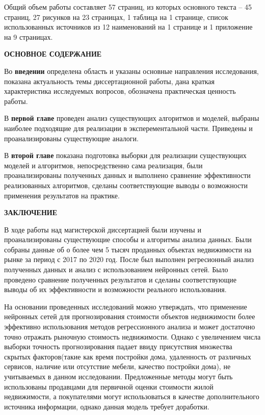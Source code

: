 Общий объем работы составляет 57 страниц, из которых основного текста -- 45 страниц, 27 рисунков на 23 страницах,
1 таблица на 1 странице, список использованных источников из 12 наименований на 1 странице и 1 приложение на 9 страницах.

\begin{center}
  \textbf{ОСНОВНОЕ СОДЕРЖАНИЕ}\\
\end{center}

Во \textbf{введении} определена область и указаны основные направления исследования, показана актуальность темы
диссертационной работы, дана краткая характеристика исследуемых вопросов, обозначена практическая ценность работы.

В \textbf{первой главе} проведен анализ существующих алгоритмов и моделей, выбраны наиболее подходящие для реализации
в эксперементальной части. Приведены и проанализированы существующие аналоги.

В \textbf{второй главе} показана подготовка выборки для реализации существующих моделей и алгоритмов, 
непосредственно сама реализация, были проанализированы полученных данных и выполнено сравнение эффективности реализованных
алгоритмов, сделаны соответствующие выводы о возможности применения результатов на практике.

\begin{center}
  \textbf{ЗАКЛЮЧЕНИЕ}\\
\end{center}

В ходе работы над магистерской диссертацией были изучены и проанализированы существующие способы и алгоритмы анализа
данных. Были собраны данные об о более чем 5 тысяч проданных объектах недвижимости на рынке за период с 2017 по 2020 год.
После был выполнен регресионный анализ
полученных данных и анализ с использованием нейронных сетей. Было проведено сравнение полученных результатов и сделаны
соответствующие выводы об их эффективности и возможности реального использования.

На основании проведенных исследований можно утверждать, что применение нейронных сетей для прогнозирования
стоимости объектов недвижимости более эффективно использования методов регрессионного анализа и может достаточно
точно отражать рыночную стоимость недвижимости. Однако с увеличением числа выборки точность прогнозирования падает ввиду
присутствия множества скрытых факторов(такие как время постройки дома, удаленность от различных сервисов, наличие или
отсутствие мебели, качество постройки дома), не учитываемых в данном исследовании.
Предложенные методы могут быть использованы продавцами для первичной оценки стоимости жилой недвижимости,
а покупателями могут использоваться в качестве дополнительного источника информации, однако данная модель требует
доработки.

